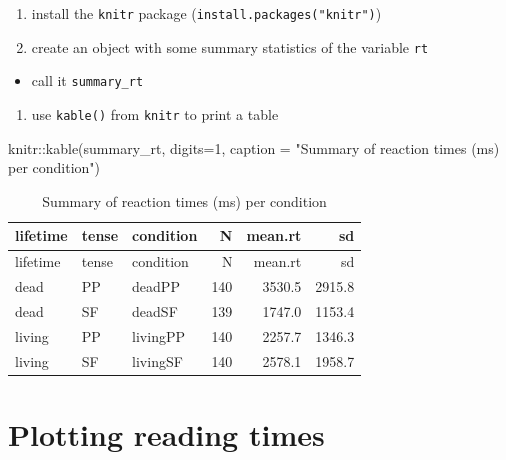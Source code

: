 \documentclass[
  letterpaper,
  DIV=11,
  numbers=noendperiod]{scrartcl}
\newenvironment{Shaded}{\begin{snugshade}}{\end{snugshade}}
\newcommand{\AttributeTok}[1]{\textcolor[rgb]{0.40,0.45,0.13}{#1}}
\newcommand{\DecValTok}[1]{\textcolor[rgb]{0.68,0.00,0.00}{#1}}
\newcommand{\FunctionTok}[1]{\textcolor[rgb]{0.28,0.35,0.67}{#1}}
\newcommand{\NormalTok}[1]{\textcolor[rgb]{0.00,0.23,0.31}{#1}}
\newcommand{\SpecialCharTok}[1]{\textcolor[rgb]{0.37,0.37,0.37}{#1}}
\newcommand{\StringTok}[1]{\textcolor[rgb]{0.13,0.47,0.30}{#1}}
\providecommand{\tightlist}{%
  \setlength{\itemsep}{0pt}\setlength{\parskip}{0pt}}\usepackage{longtable,booktabs,array}
\begin{document}
\begin{enumerate}
\def\labelenumi{\arabic{enumi}.}
\tightlist
\item
  install the \texttt{knitr} package
  (\texttt{install.packages("knitr")})
\item
  create an object with some summary statistics of the variable
  \texttt{rt}
\end{enumerate}

\begin{itemize}
\tightlist
\item
  call it \texttt{summary\_rt}
\end{itemize}

\begin{enumerate}
\def\labelenumi{\arabic{enumi}.}
\setcounter{enumi}{2}
\tightlist
\item
  use \texttt{kable()} from \texttt{knitr} to print a table
\end{enumerate}

\begin{Shaded}
\begin{Highlighting}[]
\NormalTok{knitr}\SpecialCharTok{::}\FunctionTok{kable}\NormalTok{(summary\_rt, }\AttributeTok{digits=}\DecValTok{1}\NormalTok{,}
             \AttributeTok{caption =} \StringTok{"Summary of reaction times (ms) per condition"}\NormalTok{)}
\end{Highlighting}
\end{Shaded}

\begin{longtable}[]{@{}lllrrr@{}}
\caption{Summary of reaction times (ms) per condition}\tabularnewline
\toprule\noalign{}
lifetime & tense & condition & N & mean.rt & sd \\
\midrule\noalign{}
\endfirsthead
\toprule\noalign{}
lifetime & tense & condition & N & mean.rt & sd \\
\midrule\noalign{}
\endhead
\bottomrule\noalign{}
\endlastfoot
dead & PP & deadPP & 140 & 3530.5 & 2915.8 \\
dead & SF & deadSF & 139 & 1747.0 & 1153.4 \\
living & PP & livingPP & 140 & 2257.7 & 1346.3 \\
living & SF & livingSF & 140 & 2578.1 & 1958.7 \\
\end{longtable}

\hypertarget{plotting-reading-times}{%
\section{Plotting reading times}\label{plotting-reading-times}}
\end{document}
